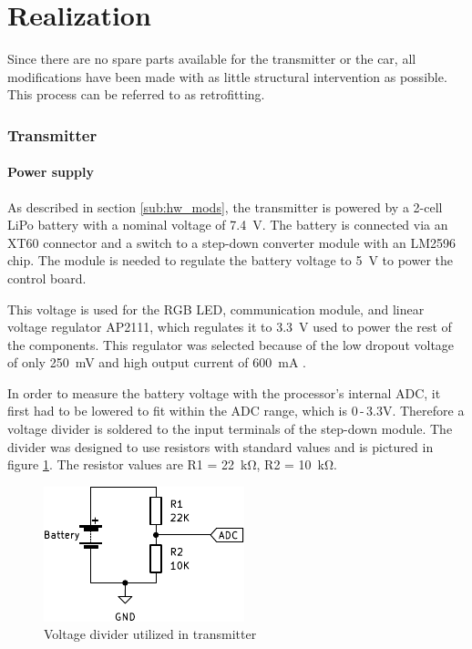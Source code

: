 


\part{Realization}
\label{chap:realization}
Since there are no spare parts available for the transmitter or the car, all modifications have been made with as little structural intervention as possible. This process can be referred to as retrofitting.

\section{Transmitter}
\label{sec:real_tx}
\subsection{Power supply}
As described in section \ref{sub:hw_mods}, the transmitter is powered by a 2-cell LiPo battery with a nominal voltage of \SI{7.4}{\V}. The battery is connected via an XT60 connector and a switch to a step-down converter module with an LM2596 chip. The module is needed to regulate the battery voltage to \SI{5}{\V} to power the control board.

This voltage is used for the RGB LED, communication module, and linear voltage regulator AP2111, which regulates it to \SI{3.3}{\V} used to power the rest of the components. This regulator was selected because of the low dropout voltage of only \SI{250}{\mV} and high output current of \SI{600}{\mA} \cite{ap_datasheet}.

In order to measure the battery voltage with the processor's internal ADC, it first had to be lowered to fit within the ADC range, which is $0\, \text{-}\, 3.3$\unit{\V}. Therefore a voltage divider is soldered to the input terminals of the step-down module. The divider was designed to use resistors with standard values and is pictured in figure \ref{fig:tx_div}. The resistor values are R1 = \SI{22}{\kohm}, R2 = \SI{10}{\kohm}.
\begin{figure}[h]
\centering
\includegraphics[width=0.4\linewidth]{fig/voltage_divider.pdf}
\caption{Voltage divider utilized in transmitter }
\label{fig:tx_div}
\end{figure}

